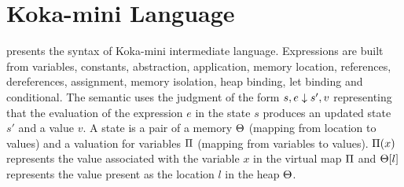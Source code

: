 \section{Koka-mini Language}

 presents the syntax of Koka-mini intermediate language. Expressions are built from variables, constants, abstraction, application, memory location, references, dereferences, assignment, memory isolation, heap binding, let binding and conditional. The semantic uses the judgment of the form $s,e \downarrow s',v$ representing that the evaluation of the expression $e$ in the state $s$ produces an updated state $s'$ and a value $v$.
A state is a pair of a memory $\Theta$ (mapping from location to values) and a valuation for variables $\Pi$ (mapping from variables to values). $\Pi(x)$ represents the value associated with the variable $x$ in the virtual map $\Pi$ and $\Theta[l]$ represents the value present as the location $l$ in the heap $\Theta$.

